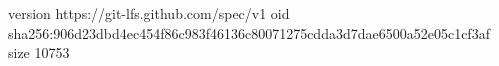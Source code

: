 version https://git-lfs.github.com/spec/v1
oid sha256:906d23dbd4ec454f86c983f46136c80071275cdda3d7dae6500a52e05c1cf3af
size 10753
